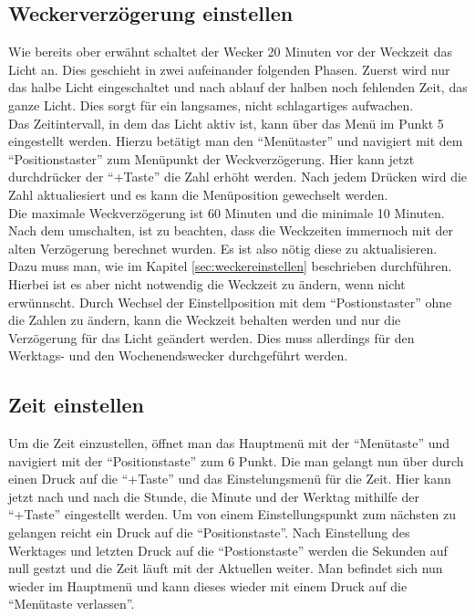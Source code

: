 \documentclass[12pt,a4paper,titlepage,headinclude]{scrartcl}
\numberwithin{equation}{subsection}
\begin{document}
\subsection{Weckerverzögerung einstellen}
Wie bereits ober erwähnt schaltet der Wecker 20 Minuten vor der Weckzeit das Licht an.
Dies geschieht in zwei aufeinander folgenden Phasen.
Zuerst wird nur das halbe Licht eingeschaltet und nach ablauf der halben noch fehlenden Zeit, das ganze Licht.
Dies sorgt für ein langsames, nicht schlagartiges aufwachen.\\
Das Zeitintervall, in dem das Licht aktiv ist, kann über das Menü im Punkt 5 eingestellt werden.
Hierzu betätigt man den "`Menütaster"' und navigiert mit dem "`Positionstaster"' zum Menüpunkt der Weckverzögerung.
Hier kann jetzt durchdrücker der "`+Taste"' die Zahl erhöht werden.
Nach jedem Drücken wird die Zahl aktualiesiert und es kann die Menüposition gewechselt werden.\\
Die maximale Weckverzögerung ist 60 Minuten und die minimale 10 Minuten.
Nach dem umschalten, ist zu beachten, dass die Weckzeiten immernoch mit der alten Verzögerung berechnet wurden.
Es ist also nötig diese zu aktualisieren.
Dazu muss man, wie im Kapitel \ref{sec:weckereinstellen} beschrieben durchführen.
Hierbei ist es aber nicht notwendig die Weckzeit zu ändern, wenn nicht erwünnscht.
Durch Wechsel der Einstellposition mit dem "`Postionstaster"' ohne die Zahlen zu ändern, kann die Weckzeit behalten werden und nur die Verzögerung für das Licht geändert werden.
Dies muss allerdings für den Werktags- und den Wochenendswecker durchgeführt werden.

\subsection{Zeit einstellen}
Um die Zeit einzustellen, öffnet man das Hauptmenü mit der "`Menütaste"' und navigiert mit der "`Positionstaste"' zum 6 Punkt.
Die man gelangt nun über durch einen Druck auf die "`+Taste"' und das Einstelungsmenü für die Zeit.
Hier kann jetzt nach und nach die Stunde, die Minute und der Werktag mithilfe der "`+Taste"' eingestellt werden.
Um von einem Einstellungspunkt zum nächsten zu gelangen reicht ein Druck auf die "`Positionstaste"'.
Nach Einstellung des Werktages und letzten Druck auf die "`Postionstaste"' werden die Sekunden auf null gestzt und die Zeit läuft mit der Aktuellen weiter.
Man befindet sich nun wieder im Hauptmenü und kann dieses wieder mit einem Druck auf die "`Menütaste verlassen"'.
\end{document}
